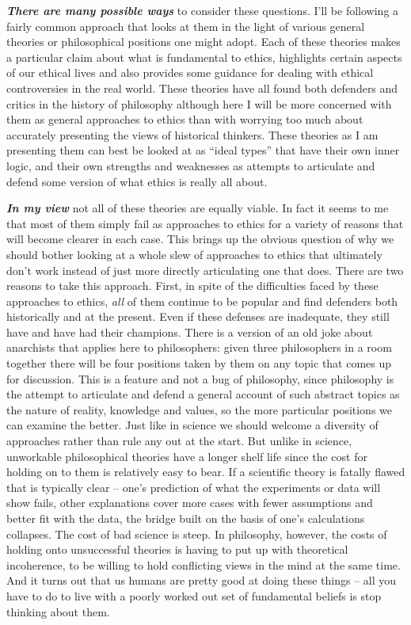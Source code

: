 \documentclass[
  12pt, openany]{book}
\begin{document}
\textbf{\emph{There are many possible ways}} to consider these questions. I'll be following a fairly common approach that looks at them in the light of various general theories or philosophical positions one might adopt. Each of these theories makes a particular claim about what is fundamental to ethics, highlights certain aspects of our ethical lives and also provides some guidance for dealing with ethical controversies in the real world. These theories have all found both defenders and critics in the history of philosophy although here I will be more concerned with them as general approaches to ethics than with worrying too much about accurately presenting the views of historical thinkers. These theories as I am presenting them can best be looked at as ``ideal types'' that have their own inner logic, and their own strengths and weaknesses as attempts to articulate and defend some version of what ethics is really all about.

\textbf{\emph{In my view}} not all of these theories are equally viable. In fact it seems to me that most of them simply fail as approaches to ethics for a variety of reasons that will become clearer in each case. This brings up the obvious question of why we should bother looking at a whole slew of approaches to ethics that ultimately don't work instead of just more directly articulating one that does. There are two reasons to take this approach. First, in spite of the difficulties faced by these approaches to ethics, \emph{all} of them continue to be popular and find defenders both historically and at the present. Even if these defenses are inadequate, they still have and have had their champions. There is a version of an old joke about anarchists that applies here to philosophers: given three philosophers in a room together there will be four positions taken by them on any topic that comes up for discussion. This is a feature and not a bug of philosophy, since philosophy is the attempt to articulate and defend a general account of such abstract topics as the nature of reality, knowledge and values, so the more particular positions we can examine the better. Just like in science we should welcome a diversity of approaches rather than rule any out at the start. But unlike in science, unworkable philosophical theories have a longer shelf life since the cost for holding on to them is relatively easy to bear. If a scientific theory is fatally flawed that is typically clear -- one's prediction of what the experiments or data will show fails, other explanations cover more cases with fewer assumptions and better fit with the data, the bridge built on the basis of one's calculations collapses. The cost of bad science is steep. In philosophy, however, the costs of holding onto unsuccessful theories is having to put up with theoretical incoherence, to be willing to hold conflicting views in the mind at the same time. And it turns out that us humans are pretty good at doing these things -- all you have to do to live with a poorly worked out set of fundamental beliefs is stop thinking about them.
\end{document}
